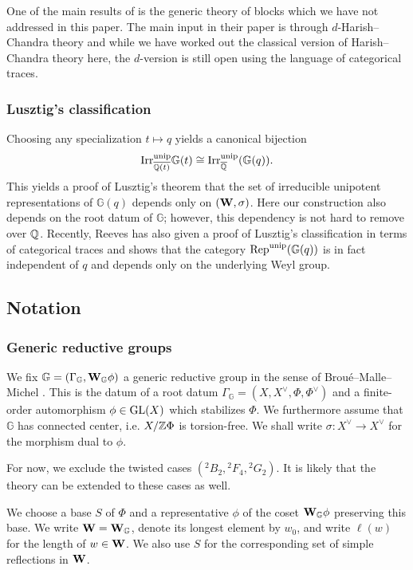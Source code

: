 \documentclass[a4paper, 10pt, oneside, reqno]{amsart}
\theoremstyle{plain}
\theoremstyle{definition}
\theoremstyle{remark}
\newcommand{\Gbb}{\mathbb{G}}
\begin{document}
One of the main results of \cite{BroueMalleMichel} is the generic theory of blocks which we have not addressed in this paper. The main input in their paper is through $d$-Harish--Chandra theory and while we have worked out the classical version of Harish--Chandra theory here, the $d$-version is still open using the language of categorical traces.

\subsubsection{Lusztig's classification}

Choosing any specialization $t \mapsto q$ yields a canonical bijection 
$$\Irr_{\overline{\Q(t)}}^{\unip}\Gbb(t) \cong \Irr_{\overline{\Q}}^{\unip}(\Gbb(q)).$$
This yields a proof of Lusztig's theorem \cite{LusztigBook} that the set of irreducible unipotent representations of $\Gbb(q)$ depends only on $(\mathbf{W}, \sigma)$. Here our construction also depends on the root datum of $\Gbb$; however, this dependency is not hard to remove over $\mathbb{Q}$. Recently, Reeves \cite{ReevesUnipotentTrace} has also given a proof of Lusztig's classification in terms of categorical traces and shows that the category $\Rep^{\unip}(\Gbb(q))$ is in fact independent of $q$ and depends only on the underlying Weyl group. 

\subsection{Notation}

\subsubsection{Generic reductive groups}\label{ssec:generic-reductive-groups}
We fix $\Gbb = (\Gamma_{\Gbb}, \Wbf_{\Gbb}\phi)$ a generic reductive group in the sense of Broué--Malle--Michel \cite{BroueMalleMichel}. This is the datum of a root datum $\Gamma_{\Gbb} = (X, X^{\vee}, \Phi, \Phi^{\vee})$ and a finite-order automorphism $\phi \in \mathrm{GL}(X)$ which stabilizes $\Phi$. We furthermore assume that $\Gbb$ has connected center, i.e. $X/\mathbb{Z}\Phi$ is torsion-free. We shall write $\sigma : X^{\vee} \to X^{\vee}$ for the morphism dual to $\phi$. 


For now, we exclude the twisted cases $({^2}B_2, {^2}F_4, {^2}G_2)$. It is likely that the theory can be extended to these cases as well. 

We choose a base $S$ of $\Phi$ and a representative $\phi$ of the coset
$\Wbf_{\Gbb}\phi$ preserving this base. We write $\Wbf = \Wbf_{\Gbb}$, denote its longest element by $w_0$, and write $\ell(w)$ for the length of $w \in \mathbf{W}$. We also use $S$ for the corresponding set of simple reflections in $\mathbf{W}$.
\end{document}
